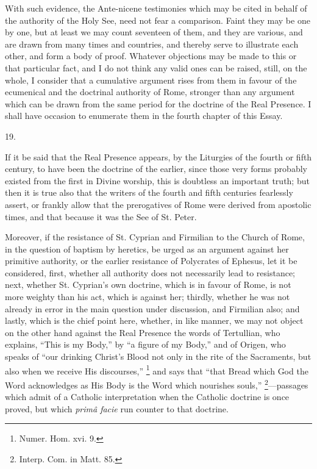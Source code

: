 With such evidence, the Ante-nicene testimonies which
may be cited in behalf of the authority of the Holy See,
need not fear a comparison. Faint they may be one by one,
but at least we may count seventeen of them, and they are
various, and are drawn from many times and countries, and
thereby serve to illustrate each other, and form a body
of proof. Whatever objections may be made to this or that
particular fact, and I do not think any valid ones can be
raised, still, on the whole, I consider that a cumulative
argument rises from them in favour of the ecumenical and the doctrinal authority of Rome, stronger than any
argument which can be drawn from the same period for the
doctrine of the Real Presence. I shall have occasion to
enumerate them in the fourth chapter of this Essay.

19.

If it be said that the Real Presence appears, by the
Liturgies of the fourth or fifth century, to have been
the doctrine of the earlier, since those very forms
probably existed from the first in Divine worship, this
is doubtless an important truth; but then it is true also
that the writers of the fourth and fifth centuries
fearlessly assert, or frankly allow that the prerogatives
of Rome were derived from apostolic times, and that
because it was the See of St. Peter.

Moreover, if the resistance of St. Cyprian and
Firmilian to the Church of Rome, in the question of
baptism by heretics, be urged as an argument against her
primitive authority, or the earlier resistance of
Polycrates of Ephesus, let it be considered, first,
whether all authority does not necessarily lead to
resistance; next, whether St. Cyprian's own doctrine,
which is in favour of Rome, is not more weighty than his
act, which is against her; thirdly, whether he was not
already in error in the main question under discussion,
and Firmilian also; and lastly, which is the chief point
here, whether, in like manner, we may not object on the
other hand against the Real Presence the words of
Tertullian, who explains, ``This is my Body,'' by
``a figure of my Body,'' and of Origen, who
speaks of ``our drinking Christ's Blood not only in
the rite of the Sacraments, but also when we receive His
discourses,'' \footnote{Numer. Hom. xvi. 9.} and says that ``that
Bread which God the Word acknowledges as His Body is the
Word which nourishes souls,'' \footnote{Interp. Com. in Matt. 85.}—passages which admit of
a Catholic interpretation when the Catholic doctrine is once proved, but which \emph{primâ facie} run counter to
that doctrine.

